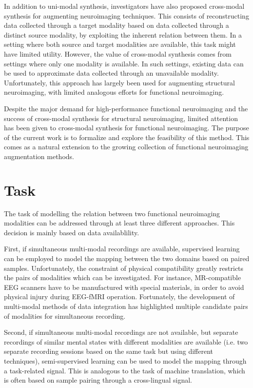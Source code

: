 \documentclass{article}
\begin{document}
In addition to uni-modal synthesis, investigators have also proposed cross-modal synthesis for augmenting neuroimaging techniques. This consists of reconstructing data collected through a target modality based on data collected through a distinct source modality, by exploiting the inherent relation between them. In a setting where both source and target modalities are available, this task might have limited utility. However, the value of cross-modal synthesis comes from settings where only one modality is available. In such settings, existing data can be used to approximate data collected through an unavailable modality. Unfortunately, this approach has largely been used for augmenting structural neuroimaging, with limited analogous efforts for functional neuroimaging.

Despite the major demand for high-performance functional neuroimaging and the success of cross-modal synthesis for structural neuroimaging, limited attention has been given to cross-modal synthesis for functional neuroimaging. The purpose of the current work is to formalize and explore the feasibility of this method. This comes as a natural extension to the growing collection of functional neuroimaging augmentation methods.

\section{Task}

The task of modelling the relation between two functional neuroimaging modalities can be addressed through at least three different approaches. This decision is mainly based on data availablility.

First, if simultaneous multi-modal recordings are available, supervised learning can be employed to model the mapping between the two domains based on paired samples. Unfortunately, the constraint of physical compatibility greatly restricts the pairs of modalities which can be investigated. For instance, MR-compatible EEG scanners have to be manufactured with special materials, in order to avoid physical injury during EEG-fMRI operation. Fortunately, the development of multi-modal methods of data integration has highlighted multiple candidate pairs of modalities for simultaneous recording.

Second, if simultaneous multi-modal recordings are not available, but separate recordings of similar mental states with different modalities are available (i.e. two separate recording sessions based on the same task but using different techniques), semi-supervised learning can be used to model the mapping through a task-related signal. This is analogous to the task of machine translation, which is often based on sample pairing through a cross-lingual signal.
\end{document}
